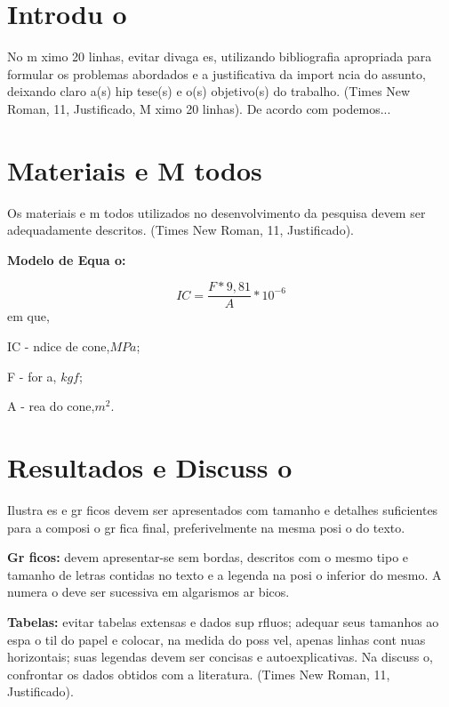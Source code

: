 \documentclass{article}
\begin{document}
\section*{Introdu o}

No m ximo 20 linhas, evitar divaga es, utilizando bibliografia apropriada para formular os problemas abordados e a justificativa da import ncia do assunto, deixando claro a(s) hip tese(s) e o(s) objetivo(s) do trabalho. (Times New Roman, 11, Justificado, M ximo 20 linhas). De acordo com \cite{alves} podemos...

\section*{Materiais e M todos}

Os materiais e m todos utilizados no desenvolvimento da pesquisa devem ser adequadamente descritos. (Times New Roman, 11, Justificado).

\textbf{Modelo de Equa o:}

\begin{equation} \label{eq:nome}
IC=\frac{F*9,81}{A}*10^{-6}
\end{equation}
em que,

IC -  ndice de cone,$MPa$;

F - for a, $kgf$;

A -  rea do cone,$m^{2}$.


\section*{Resultados e Discuss o}

Ilustra es e gr ficos devem ser apresentados com tamanho e detalhes suficientes para a composi o gr fica final, preferivelmente na mesma posi o do texto.

\textbf{Gr ficos:} devem apresentar-se sem bordas, descritos com o mesmo tipo e tamanho de letras contidas no texto e a legenda na posi o inferior do mesmo. A numera o deve ser sucessiva em algarismos ar bicos.

\textbf{Tabelas:} evitar tabelas extensas e dados sup rfluos; adequar seus tamanhos ao espa o  til do papel e colocar, na medida do poss vel, apenas linhas cont nuas horizontais; suas legendas devem ser concisas e autoexplicativas. Na discuss o, confrontar os dados obtidos com a literatura. (Times New Roman, 11, Justificado).
\vspace{0.5cm}
\end{document}
